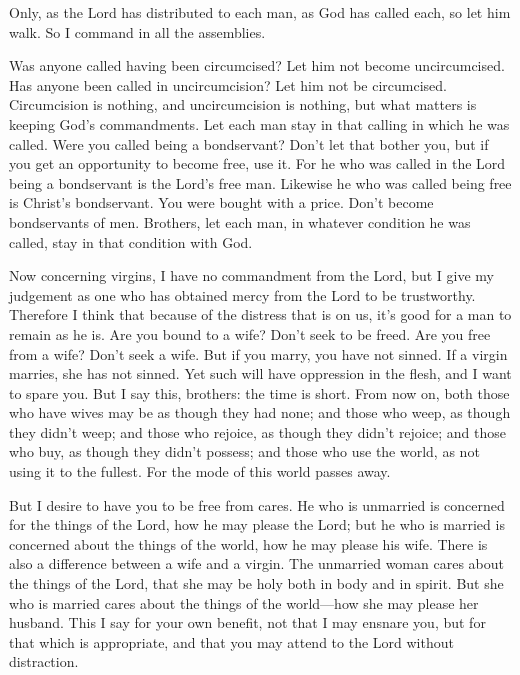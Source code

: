  Only, as the Lord has distributed to each man, as God has
called each, so let him walk. So I command in all the assemblies.

 Was anyone called having been circumcised? Let him not
become uncircumcised. Has anyone been called in uncircumcision? Let him
not be circumcised.  Circumcision is nothing, and
uncircumcision is nothing, but what matters is keeping God's
commandments.  Let each man stay in that calling in which
he was called.  Were you called being a bondservant? Don't
let that bother you, but if you get an opportunity to become free, use
it.  For he who was called in the Lord being a bondservant
is the Lord's free man. Likewise he who was called being free is
Christ's bondservant.  You were bought with a price. Don't
become bondservants of men.  Brothers, let each man, in
whatever condition he was called, stay in that condition with God.

 Now concerning virgins, I have no commandment from the
Lord, but I give my judgement as one who has obtained mercy from the
Lord to be trustworthy.  Therefore I think that because of
the distress that is on us, it's good for a man to remain as he is.
 Are you bound to a wife? Don't seek to be freed. Are you
free from a wife? Don't seek a wife.  But if you marry, you
have not sinned. If a virgin marries, she has not sinned. Yet such will
have oppression in the flesh, and I want to spare you.  But
I say this, brothers: the time is short. From now on, both those who
have wives may be as though they had none;  and those who
weep, as though they didn't weep; and those who rejoice, as though they
didn't rejoice; and those who buy, as though they didn't possess;
 and those who use the world, as not using it to the
fullest. For the mode of this world passes away.

 But I desire to have you to be free from cares. He who is
unmarried is concerned for the things of the Lord, how he may please the
Lord;  but he who is married is concerned about the things
of the world, how he may please his wife.  There is also a
difference between a wife and a virgin. The unmarried woman cares about
the things of the Lord, that she may be holy both in body and in spirit.
But she who is married cares about the things of the world---how she may
please her husband.  This I say for your own benefit, not
that I may ensnare you, but for that which is appropriate, and that you
may attend to the Lord without distraction.

